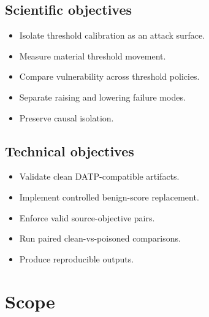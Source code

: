 \begin{minipage}[t]{0.48\linewidth}
\subsection*{Scientific objectives}
\begin{itemize}
  \item Isolate threshold calibration as an attack surface.
  \item Measure material threshold movement.
  \item Compare vulnerability across threshold policies.
  \item Separate raising and lowering failure modes.
  \item Preserve causal isolation.
\end{itemize}
\end{minipage}%
\hfill
\begin{minipage}[t]{0.48\linewidth}
\subsection*{Technical objectives}
\begin{itemize}
  \item Validate clean DATP-compatible artifacts.
  \item Implement controlled benign-score replacement.
  \item Enforce valid source-objective pairs.
  \item Run paired clean-vs-poisoned comparisons.
  \item Produce reproducible outputs.
\end{itemize}
\end{minipage}

\vspace{0.5em}

\section{Scope}

